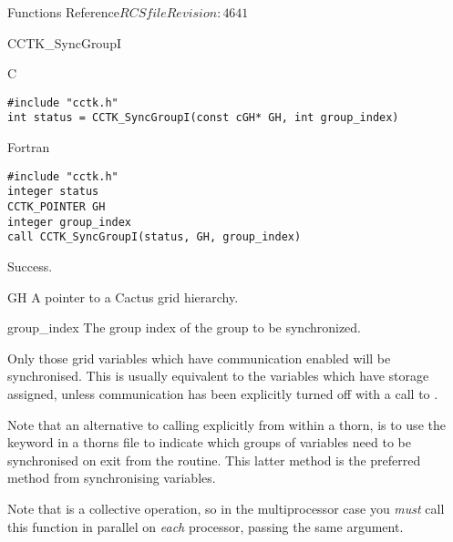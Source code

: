 \begin{cactuspart}{ Functions Reference}{$RCSfile$}{$Revision: 4641 $}
\begin{FunctionDescription}{CCTK\_SyncGroupI}
\begin{SynopsisSection}
\begin{Synopsis}{C}
\begin{verbatim}
#include "cctk.h"
int status = CCTK_SyncGroupI(const cGH* GH, int group_index)
\end{verbatim}
\end{Synopsis}
\begin{Synopsis}{Fortran}
\begin{verbatim}
#include "cctk.h"
integer status
CCTK_POINTER GH
integer group_index
call CCTK_SyncGroupI(status, GH, group_index)
\end{verbatim}
\end{Synopsis}
\end{SynopsisSection}

\begin{ResultSection}
\begin{Result}{0}
Success.
\end{Result}
\end{ResultSection}

\begin{ParameterSection}
\begin{Parameter}{GH}
A pointer to a Cactus grid hierarchy.
\end{Parameter}
\begin{Parameter}{group\_index}
The group index of the group to be synchronized.
\end{Parameter}
\end{ParameterSection}

\begin{Discussion}
Only those grid variables which have communication enabled
will be synchronised. This is usually equivalent to the variables
which have storage assigned, unless communication has been explicitly
turned off with a call to .

Note that an alternative to calling  explicitly
from within a thorn, is to use the  keyword in a thorns
 file to indicate which groups of variables need
to be synchronised on exit from the routine. This latter method is
the preferred method from synchronising variables.

Note that  is a collective operation, so in the
multiprocessor case you {\em must\/} call this function in parallel on
{\em each\/} processor, passing the same  argument.
\end{Discussion}


\end{FunctionDescription}
\end{cactuspart}
